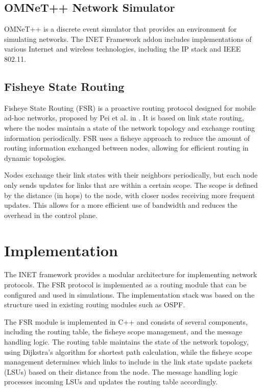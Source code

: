 \documentclass{winslabreport}
\begin{document}
\subsection{OMNeT++ Network Simulator}
OMNeT++ \cite{omnetpp} is a discrete event simulator that provides an environment for simulating networks. The INET Framework addon includes implementations of various Internet and wireless technologies, including the IP stack and IEEE 802.11.

\subsection{Fisheye State Routing}
Fisheye State Routing (FSR) is a proactive routing protocol designed for mobile ad-hoc networks, proposed by Pei et al. in \cite{peiFisheyeStateRouting2000}. It is based on link state routing, where the nodes maintain a state of the network topology and exchange routing information periodically. FSR uses a fisheye approach to reduce the amount of routing information exchanged between nodes, allowing for efficient routing in dynamic topologies.

Nodes exchange their link states with their neighbors periodically, but each node only sends updates for links that are within a certain scope. The scope is defined by the distance (in hops) to the node, with closer nodes receiving more frequent updates. This allows for a more efficient use of bandwidth and reduces the overhead in the control plane.

\section{Implementation}
The INET framework provides a modular architecture for implementing network protocols. The FSR protocol is implemented as a routing module that can be configured and used in simulations. The implementation stack was based on the structure used in existing routing modules such as OSPF.

The FSR module is implemented in C++ and consists of several components, including the routing table, the fisheye scope management, and the message handling logic. The routing table maintains the state of the network topology, using Dijkstra's algorithm for shortest path calculation, while the fisheye scope management determines which links to include in the link state update packets (LSUs) based on their distance from the node. The message handling logic processes incoming LSUs and updates the routing table accordingly.
\end{document}

